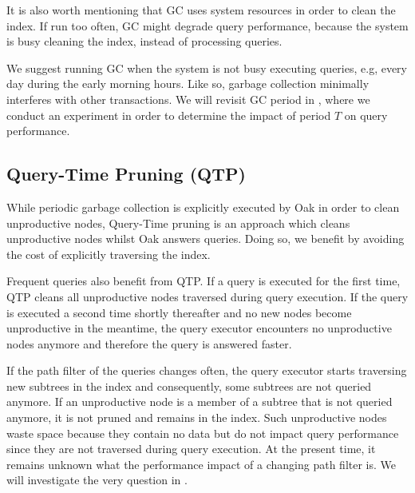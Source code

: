 \documentclass[abstracton,12pt]{scrartcl}
\theoremstyle{definition}
\begin{document}
It is also worth mentioning that GC uses system resources in order to clean the
index. If run too often, GC might degrade query performance, because the system
is busy cleaning the index, instead of processing queries.

We suggest running GC when the system is not busy executing queries, e.g, every
day during the 
early morning hours. Like so, garbage collection minimally interferes with other
transactions. We will revisit GC period in , where we
conduct an experiment in order to determine the impact of period $T$ on
query performance. 

\subsection{Query-Time Pruning (QTP)}

While periodic garbage collection is explicitly executed by Oak in order to
clean unproductive nodes, Query-Time pruning is an approach which cleans
unproductive nodes whilst Oak answers queries. Doing so, we benefit by
avoiding the cost of explicitly traversing the index.  

Frequent queries also benefit from QTP. If a query is executed for the first
time, QTP cleans all unproductive nodes traversed during query execution.
If the query is executed a second time shortly thereafter and  no new nodes
become unproductive in the meantime, the query executor encounters no
unproductive nodes anymore and therefore the query is answered faster.

If the path filter of the queries changes often, 
the query executor starts traversing new subtrees in the index
and consequently, some subtrees are not queried anymore. If an unproductive
node is a member of a subtree that is not queried anymore, it is not pruned and
remains in the index.
Such unproductive nodes waste space because they contain no data but do not
impact query performance since they are not traversed during query execution.
At the present time, it remains unknown what the performance impact of a changing
path filter is. We will investigate the very question in .

\end{document}
